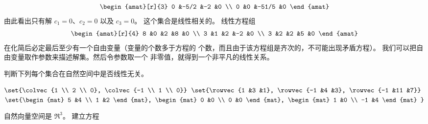 \begin{exercises}
\begin{answer}
\begin{exparts}
\begin{equation*}
\begin{amat}[r]{3}
               0  &-5/2 &-2     &0  \\
               0  &0    &-51/5  &0
             \end{amat}
           \end{equation*}
           由此看出只有解 $c_1=0$、$c_2=0$ 以及 $c_3=0$。
        \partsitem 这个集合是线性相关的。
           线性方程组
           \begin{equation*}
             \begin{amat}[r]{4}
               8  &0  &2  &8  &0  \\
               3  &1  &2  &-2 &0  \\
               3  &2  &2  &5  &0
             \end{amat}
           \end{equation*}
           在化简后必定最后至少有一个自由变量（变量的个数多于方程的
           个数，而且由于该方程组是齐次的，不可能出现矛盾方程）。
           我们可以把自由变量取作参数来描述解集。然后令参数取一个
           非零值，就得到一个非平凡的线性关系。
       \end{exparts}
      \end{answer}
  \item 判断下列每个集合在自然空间中是否线性无关。
    \begin{exparts*}
      \partsitem $\set{\colvec{1 \\ 2 \\ 0},
              \colvec{-1 \\ 1 \\ 0}}$
      \partsitem $\set{\rowvec{1 &3 &1}, \rowvec{-1 &4 &3}, \rowvec{-1 &11 &7}}$
      \partsitem $\set{\begin{mat}
                5 &4 \\
                1 &2
              \end{mat},
              \begin{mat}
                0 &0 \\
                0 &0
              \end{mat},
              \begin{mat}
                1 &0 \\
               -1 &4
              \end{mat}
           }$
    \end{exparts*}
    \begin{answer}
      \begin{exparts}
        \partsitem   自然向量空间是 $\Re^3$。
          建立方程
          \begin{equation*}

\end{equation*}
\end{exparts}
\end{answer}
\end{exercises}
